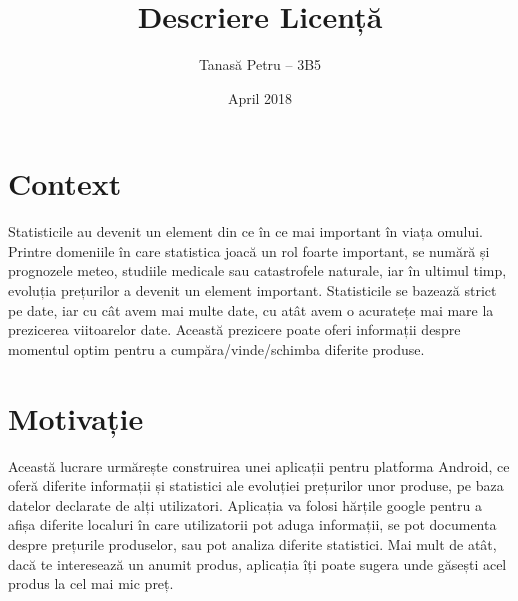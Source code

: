 \documentclass{article}
\title{Descriere Licență}
\author{Tanasă Petru – 3B5}
\date{April 2018}
\begin{document}
\maketitle

\section{Context}
Statisticile au devenit un element din ce în ce mai important în viața omului. Printre domeniile în care statistica joacă un rol foarte important, se numără și prognozele meteo, studiile medicale sau catastrofele naturale, iar în ultimul timp, evoluția prețurilor a devenit un element important. Statisticile se bazează strict pe date, iar cu cât avem mai multe date, cu atât avem o acuratețe mai mare la prezicerea viitoarelor date. Această prezicere poate oferi informații despre momentul optim pentru a cumpăra/vinde/schimba diferite produse. 

\section{Motivație}

Această lucrare urmărește construirea unei aplicații pentru platforma Android\citep{Android}, ce oferă diferite informații și statistici ale evoluției prețurilor unor produse, pe baza datelor declarate de alți utilizatori. Aplicația va folosi hărțile google\citep{GoogleMaps} pentru a afișa diferite localuri în care utilizatorii pot aduga informații, se pot documenta despre prețurile produselor, sau pot analiza diferite statistici\citep{LinearRegression}. Mai mult de atât, dacă te interesează un anumit produs, aplicația îți poate sugera unde găsești acel produs la cel mai mic preț.




\end{document}
